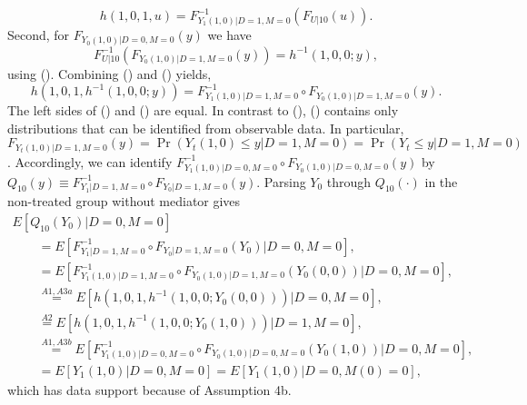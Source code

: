 \documentclass[a4paper,12pt]{article}
\begin{document}
 \doublespacing \pagestyle{plain}

\begin{equation} 
h(1,0,1,u)  =F_{Y_1(1,0)|D=1,M=0}^{-1}(F_{U|10} ( u)).
\end{equation}
Second, for $F_{Y_0(1,0)|D=0,M=0}(y)$ we have
\begin{equation} 
F_{U|10}^{-1} ( F_{Y_0(1,0)|D=1,M=0}(y)) =   h^{-1}(1,0,0;y),
\end{equation}
using (). Combining () and () yields,
\begin{equation} 
h(1,0,1,h^{-1}(1,0,0;y))  =F_{Y_1(1,0)|D=1,M=0}^{-1} \circ F_{Y_0(1,0)|D=1,M=0}(y) .
\end{equation}
The left sides of () and () are equal. In contrast to (), () contains only distributions that can be identified from observable data. In particular, $F_{Y_t(1,0)|D=1,M=0}(y)  =\Pr(Y_t(1,0) \leq y|D=1,M=0) =  \Pr(Y_t \leq y|D=1,M=0)$. Accordingly, we can identify $F_{Y_1(1,0)|D=0,M=0}^{-1} \circ F_{Y_0(1,0)|D=0,M=0}(y)$ by $Q_{10} (y) \equiv F_{Y_1|D=1,M=0}^{-1} \circ F_{Y_0|D=1,M=0}(y) $.
Parsing $Y_0$ through $Q_{10}(\cdot)$ in the non-treated group without mediator gives
\begin{equation}  \begin{array}{rl}
E[Q_{10}(Y_0)|D=0,M=0] \\  \qquad =  E[F_{Y_1|D=1,M=0}^{-1} \circ F_{Y_0|D=1,M=0}(Y_0 )|D=0,M=0], \\
 \qquad =  E[F_{Y_1(1,0)|D=1,M=0}^{-1} \circ F_{Y_0(1,0)|D=1,M=0}(Y_0(0,0))|D=0,M=0], \\
\qquad \stackrel{A1,A3a}{=}  E[h(1,0,1,h^{-1}(1,0,0; Y_0(0,0)))|D=0,M=0], \\
\qquad \stackrel{A2}{=} E[h(1,0,1,h^{-1}(1,0,0; Y_0(1,0)))|D=1,M=0] ,\\
\qquad \stackrel{A1,A3b}{=}E[F_{Y_1(1,0)|D=0,M=0}^{-1} \circ F_{Y_0(1,0)|D=0,M=0}(Y_0 (1,0))|D=0,M=0],\\
\qquad =E[Y_1(1,0)|D=0,M=0]=E[Y_1(1,0)|D=0,M(0)=0],
\end{array} \end{equation}
which has data support because of Assumption 4b.
\end{document}
